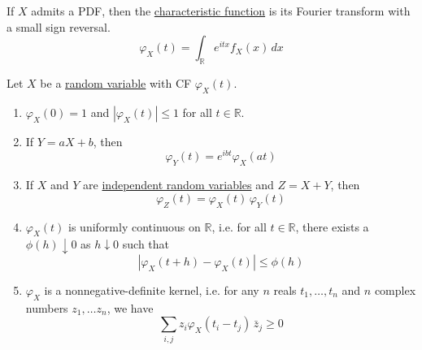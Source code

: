 	If $X$ admits a PDF, then the \hyperref[def:characteristic-function]{characteristic function} is its Fourier transform with a small sign reversal. 
	\begin{equation}
		\varphi_X (t) = \int_\mathbb{R} e^{i t x} f_X (x)\,dx
	\end{equation}

	\begin{theorem}[Properties of CF]
	  \label{thm:properties-of-cf}
		Let $X$ be a \hyperref[def:random-variable]{random variable} with CF $\varphi_X (t)$. 
		\begin{enumerate}
			\item $\varphi_X (0) = 1$  and $|\varphi_X (t)| \leq 1$ for all $t \in \mathbb{R}$. 
			\item If $Y = a X + b$, then 
			\begin{equation}
				\varphi_Y (t) = e^{i b t} \varphi_X (a t)
			\end{equation}
			\item If $X$ and $Y$ are \hyperref[def:independent-random-variables]{independent random variables} and $Z = X + Y$, then 
			\begin{equation}
				\varphi_Z (t) = \varphi_X (t) \, \varphi_Y (t)
			\end{equation}
			\item $\varphi_X (t)$ is uniformly continuous on $\mathbb{R}$, i.e. for all $t \in \mathbb{R}$, there exists a $\phi(h) \downarrow 0$ as $h \downarrow 0$ such that 
			\begin{equation}
				|\varphi_X (t + h) - \varphi_X (t)| \leq \phi(h)
			\end{equation}
			\item $\varphi_X$ is a nonnegative-definite kernel, i.e. for any $n$ reals $t_1, \ldots, t_n$ and $n$ complex numbers $z_1, \ldots z_n$, we have 
			\begin{equation}
				\sum_{i, j} z_i \varphi_X (t_i - t_j) \, \bar{z}_j \geq 0
			\end{equation}
		\end{enumerate}
	\end{theorem}
